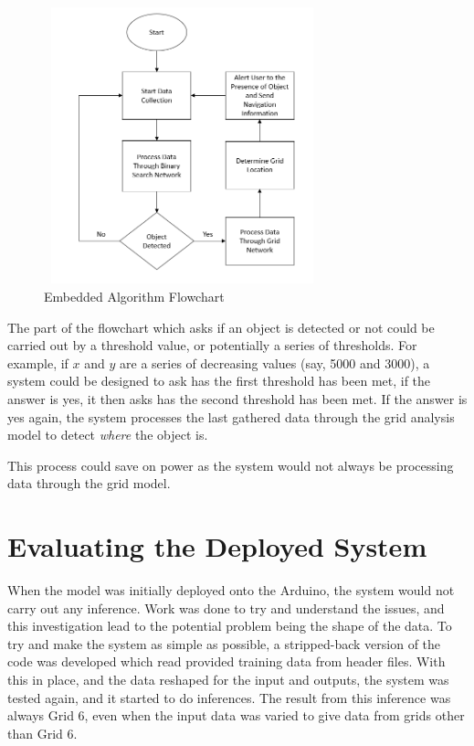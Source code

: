 \documentclass{svproc}
\begin{document}
\begin{figure}[ht]
\includegraphics[width=8cm, height=8cm]{images/embedded_algo_flowchart.png}
\centering
\caption{Embedded Algorithm Flowchart}
\label{fig:embedded_algo_flowchart}
\end{figure}

The part of the flowchart which asks if an object is detected or not could be carried out by a threshold value, or potentially a series of thresholds. 
For example, if $x$ and $y$ are a series of decreasing values (say, 5000 and 3000), a system could be designed to ask has the first threshold has 
been met, if the answer is yes, it then asks has the second threshold has been met. If the answer is yes again, the system processes the last gathered 
data through the grid analysis model to detect \textit{where} the object is. 

This process could save on power as the system would not always be processing data through the grid model.

\section{Evaluating the Deployed System}
When the model was initially deployed onto the Arduino, the system would not carry out any inference. Work was done to try and understand the issues, 
and this investigation lead to the potential problem being the shape of the data. To try and make the system as simple as possible, a stripped-back 
version of the code was developed which read provided training data from header files. With this in place, and the data reshaped for the input 
and outputs, the system was tested again, and it started to do inferences. The result from this inference was always Grid 6, even when the input data 
was varied to give data from grids other than Grid 6.
\end{document}
